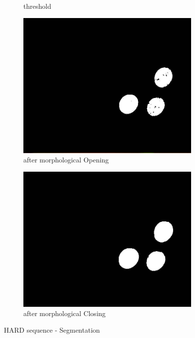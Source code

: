 \begin{figure}[ht!]
\begin{subfigure}{0.49\textwidth}
	\caption{threshold}
	\label{fig:c2}
	\end{subfigure}
		\begin{subfigure}{.49\textwidth}
		\centering
		\includegraphics[width=\textwidth]{figures/color3}
	\caption{after morphological Opening}
	\label{fig:c3}
	\end{subfigure}
	\begin{subfigure}{0.49\textwidth}
		\centering
		\includegraphics[width=\textwidth]{figures/color4}
	\caption{after morphological Closing}
	\label{fig:c4}
	\end{subfigure}
\caption{HARD sequence - Segmentation}
\label{fig:markerColorSegmenation}
\end{figure}

